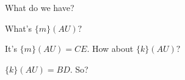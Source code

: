 What do we have?

What's $\{m\} (AU) ?$









It's $\{m\} (AU) = CE.$ How about $\{k\} (AU) ?$













$\{k\} (AU) = BD.$ So?



